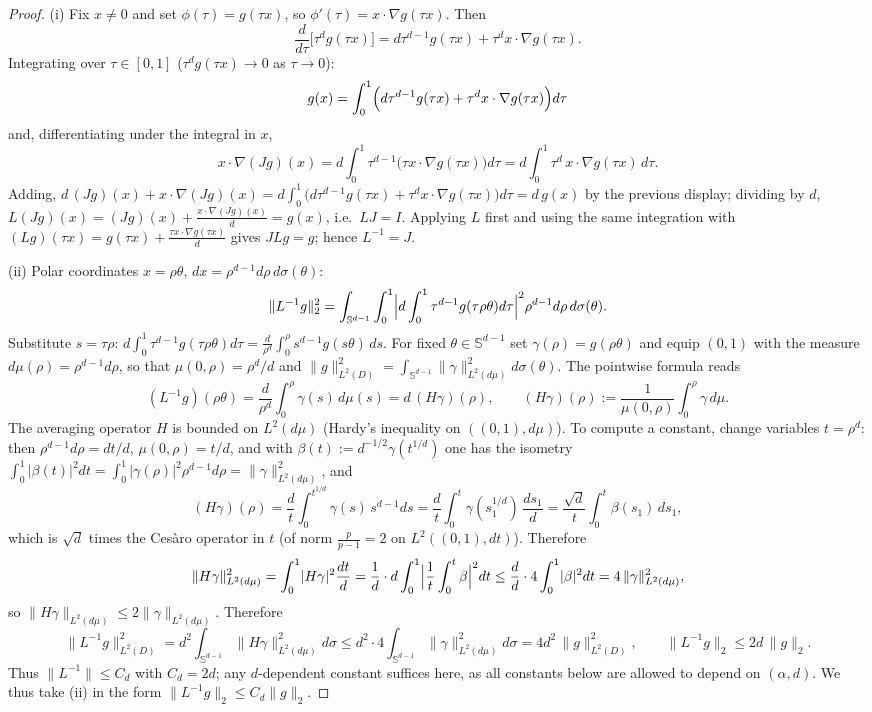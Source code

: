 \documentclass[11pt]{article}
\theoremstyle{remark}
\newcommand{\norm}[1]{\lVert #1\rVert}
\newcommand{\abs}[1]{\lvert #1\rvert}
\begin{document}
\begin{proof}
(i) Fix $x\ne0$ and set $\phi(\tau)=g(\tau x)$, so
$\phi'(\tau)=x\cdot\nabla g(\tau x)$. Then
\[
\frac{d}{d\tau}\bigl[\tau^{d}g(\tau x)\bigr]
=d\tau^{d-1}g(\tau x)+\tau^{d}x\cdot\nabla g(\tau x) .
\]
Integrating over $\tau\in[0,1]$ ($\tau^{d}g(\tau x)\to0$ as $\tau\to0$):
\[
g(x)=\int_{0}^{1}\Bigl(d\tau^{d-1}g(\tau x)+\tau^{d}x\cdot\nabla g(\tau x)\Bigr)d\tau
\]
and, differentiating under the integral in $x$,
\[
x\cdot\nabla(Jg)(x)
=d\int_0^1\tau^{d-1}\bigl(\tau x\cdot\nabla g(\tau x)\bigr)d\tau
=d\int_0^1\tau^{d}\,x\cdot\nabla g(\tau x)\,d\tau .
\]
Adding,
$d\,(Jg)(x)+x\cdot\nabla(Jg)(x)
=d\int_0^1\bigl(d\tau^{d-1}g(\tau x)+\tau^{d}x\cdot\nabla g(\tau x)\bigr)d\tau
=d\,g(x)$ by the previous display; dividing by $d$,
$L(Jg)(x)=(Jg)(x)+\frac{x\cdot\nabla(Jg)(x)}{d}=g(x)$, i.e.\ $LJ=I$.
Applying $L$ first and using the same integration with
$(Lg)(\tau x)=g(\tau x)+\frac{\tau x\cdot\nabla g(\tau x)}{d}$ gives
$JLg=g$; hence $L^{-1}=J$.

(ii) Polar coordinates $x=\rho\theta$, $dx=\rho^{d-1}d\rho\,d\sigma(\theta)$:
\[
\norm{L^{-1}g}_{2}^{2}
=\int_{\mathbb S^{d-1}}\int_{0}^{1}
\Bigl|d\int_{0}^{1}\tau^{d-1}g(\tau\rho\theta)d\tau\Bigr|^{2}
\rho^{d-1}d\rho\,d\sigma(\theta).
\]
Substitute $s=\tau\rho$:
$d\int_0^1\tau^{d-1}g(\tau\rho\theta)d\tau
=\frac{d}{\rho^{d}}\int_0^{\rho}s^{d-1}g(s\theta)\,ds$. For fixed
$\theta\in\mathbb S^{d-1}$ set $\gamma(\rho)=g(\rho\theta)$ and equip
$(0,1)$ with the measure $d\mu(\rho)=\rho^{d-1}d\rho$, so that
$\mu(0,\rho)=\rho^{d}/d$ and
$\norm{g}_{L^{2}(D)}^{2}=\int_{\mathbb S^{d-1}}\norm{\gamma}_{L^{2}(d\mu)}^{2}
d\sigma(\theta)$. The pointwise formula reads
\[
(L^{-1}g)(\rho\theta)
=\frac{d}{\rho^{d}}\int_0^{\rho}\gamma(s)\,d\mu(s)
=d\,(H\gamma)(\rho),
\qquad
(H\gamma)(\rho):=\frac{1}{\mu(0,\rho)}\int_0^{\rho}\gamma\,d\mu .
\]
The averaging operator $H$ is bounded on $L^{2}(d\mu)$
(Hardy's inequality on $((0,1),d\mu)$). To compute a constant, change
variables $t=\rho^{d}$: then $\rho^{d-1}d\rho=dt/d$, $\mu(0,\rho)=t/d$, and
with $\beta(t):=d^{-1/2}\gamma(t^{1/d})$ one has the isometry
$\int_0^1|\beta(t)|^{2}dt=\int_0^1|\gamma(\rho)|^{2}\rho^{d-1}d\rho
=\norm{\gamma}_{L^{2}(d\mu)}^{2}$, and
\[
(H\gamma)(\rho)=\frac{d}{t}\int_{0}^{t^{1/d}}\gamma(s)\,s^{d-1}ds
=\frac{d}{t}\int_{0}^{t}\gamma(s_1^{1/d})\,\frac{ds_1}{d}
=\frac{\sqrt d}{t}\int_{0}^{t}\beta(s_1)\,ds_1 ,
\]
which is $\sqrt d$ times the Ces\`aro operator in $t$ (of norm
$\frac{p}{p-1}=2$ on $L^{2}((0,1),dt)$). Therefore
\[
\norm{H\gamma}_{L^{2}(d\mu)}^{2}
=\int_0^1\abs{H\gamma}^{2}\frac{dt}{d}
=\frac1d\cdot d\int_0^1\Bigl|\frac1t\int_0^t\beta\Bigr|^{2}dt
\le\frac{d}{d}\cdot4\int_0^1\abs{\beta}^{2}dt
=4\,\norm{\gamma}_{L^{2}(d\mu)}^{2},
\]
so $\norm{H\gamma}_{L^{2}(d\mu)}\le2\norm{\gamma}_{L^{2}(d\mu)}$.
Therefore
\[
\norm{L^{-1}g}_{L^{2}(D)}^{2}
=d^{2}\!\!\int_{\mathbb S^{d-1}}\!\!\norm{H\gamma}_{L^{2}(d\mu)}^{2}d\sigma
\le d^{2}\cdot 4\int_{\mathbb S^{d-1}}\norm{\gamma}_{L^{2}(d\mu)}^{2}d\sigma
=4d^{2}\,\norm{g}_{L^{2}(D)}^{2},
\qquad
\norm{L^{-1}g}_{2}\le2d\,\norm{g}_{2}.
\]
Thus $\norm{L^{-1}}\le C_{d}$ with $C_d=2d$; any $d$-dependent
constant suffices here, as all constants below are allowed to depend on
$(\alpha,d)$. We thus take (ii) in the form
$\norm{L^{-1}g}_{2}\le C_d\norm{g}_{2}$.


\end{proof}
\end{document}
